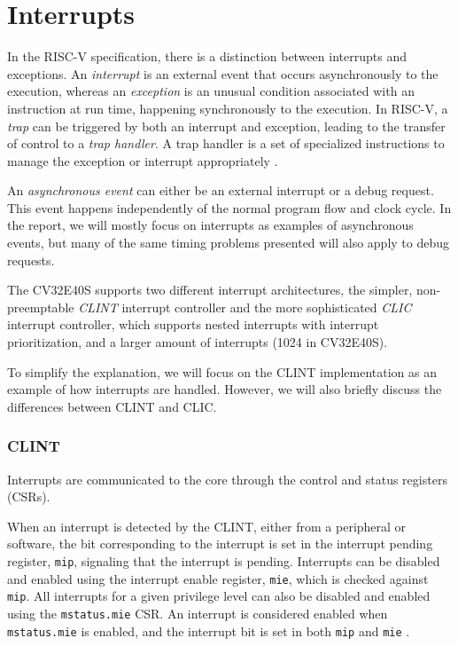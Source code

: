 \section{Interrupts}
\label{sec:bg_interrupts}

In the RISC-V specification, there is a distinction between interrupts and exceptions. An \textit{interrupt} is an external event that occurs asynchronously to the execution, whereas an \textit{exception} is an unusual condition associated with an instruction at run time, happening synchronously to the execution. In RISC-V, a \textit{trap} can be triggered by both an interrupt and exception, leading to the transfer of control to a \textit{trap handler}. A trap handler is a set of specialized instructions to manage the exception or interrupt appropriately \cite{watermanRISCVInstructionSet2021}. 

An \textit{asynchronous event} can either be an external interrupt or a debug request. This event happens independently of the normal program flow and clock cycle. In the report, we will mostly focus on interrupts as examples of asynchronous events, but many of the same timing problems presented will also apply to debug requests.


The CV32E40S supports two different interrupt architectures, the simpler, non-preemptable  \textit{CLINT} interrupt controller and the more sophisticated \textit{CLIC} interrupt controller, which supports nested interrupts with interrupt prioritization, and a larger amount of interrupts (1024 in CV32E40S)\cite{openhwgroupExceptionsInterruptsCOREV2023}. 


To simplify the explanation, we will focus on the CLINT implementation as an example of how interrupts are handled. However, we will also briefly discuss the differences between CLINT and CLIC. 

\subsubsection{CLINT}
Interrupts are communicated to the core through the control and status registers (CSRs).

When an interrupt is detected by the CLINT, either from a peripheral or software, the bit corresponding to the interrupt is set in the interrupt pending register, \lstinline{mip}, signaling that the interrupt is pending.
Interrupts can be disabled and enabled using the interrupt enable register, \lstinline{mie}, which is checked against \lstinline{mip}. All interrupts for a given privilege level can also be disabled and enabled using the \lstinline{mstatus.mie} CSR. An interrupt is considered enabled when \lstinline{mstatus.mie} is enabled, and the interrupt bit is set in both \lstinline{mip} and \lstinline{mie} \cite{watermanRISCVInstructionSet2021}.

